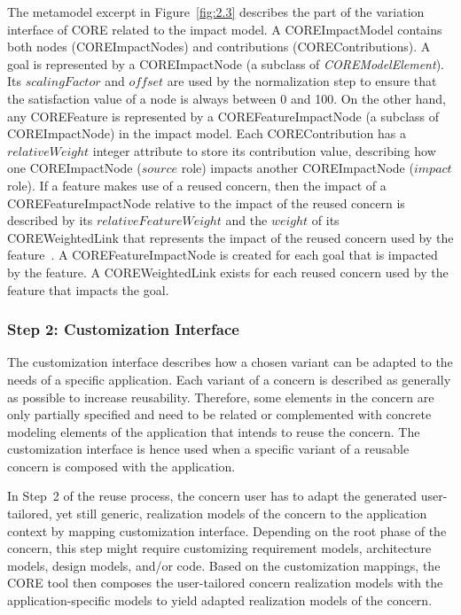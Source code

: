 The metamodel excerpt in Figure~\ref{fig:2.3} describes the part of the variation interface of CORE related to the impact model. A {\cls COREImpactModel} contains both nodes ({\cls COREImpactNode}s) and contributions ({\cls COREContribution}s). A goal is represented by a {\cls COREImpactNode} (a subclass of \textit{\cls COREModelElement}). Its $scalingFactor$ and $offset$ are used by the normalization step to ensure that the satisfaction value of a node is always between 0 and 100. On the other hand, any {\cls COREFeature} is represented by a {\cls COREFeatureImpactNode} (a subclass of {\cls COREImpactNode}) in the impact model. Each {\cls COREContribution} has a $relativeWeight$ integer attribute to store its contribution value, describing how one {\cls COREImpactNode} ($source$ role) impacts another {\cls COREImpactNode} ($impact$ role). If a feature makes use of a reused concern, then the impact of a {\cls COREFeatureImpactNode} relative to the impact of the reused concern is described by its $relativeFeatureWeight$ and the $weight$ of its {\cls COREWeightedLink} that represents the impact of the reused concern used by the feature~\cite{duran2015evaluation, alexandre2015support}. A {\cls COREFeatureImpactNode} is created for each goal that is impacted by the feature. A {\cls COREWeightedLink} exists for each reused concern used by the feature that impacts the goal.

\subsubsection{Step 2: Customization Interface}

The customization interface describes how a chosen variant can be adapted to the needs of a specific application. Each variant of a concern is described as generally as possible to increase reusability. Therefore, some elements in the concern are only partially specified and need to be related or complemented with concrete modeling elements of the application that intends to reuse the concern. The customization interface is hence used when a specific variant of a reusable concern is composed with the application.

In Step~2 of the reuse process, the concern user has to adapt the generated user-tailored, yet still generic, realization models of the concern to the application context by mapping customization interface. Depending on the root phase of the concern, this step might require customizing requirement models, architecture models, design models, and/or code. Based on the customization mappings, the CORE tool then composes the user-tailored concern realization models with the application-specific models to yield adapted realization models of the concern.


